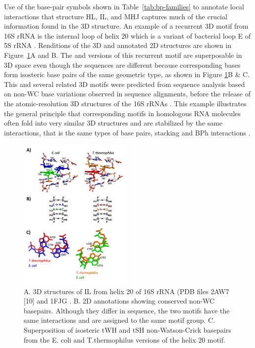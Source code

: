 Use of the base-pair symbols shown in Table~\ref{tab:bp-families} to annotate local interactions
that structure HL, IL, and MHJ captures much of the crucial information found in
the 3D structure. An example of a recurrent 3D motif from 16S rRNA is the
internal loop of helix 20 which is a variant of bacterial loop E of 5S rRNA
\cite{Leontis1998a}. Renditions of the 3D and annotated 2D structures are shown
in Figure~\ref{fig:compare-il}A and B. The \EC{} and \TT{} versions of this
recurrent motif are superposable in 3D space even though the sequences are
different because corresponding bases form isosteric base pairs of the same
geometric type, as shown in Figure \ref{fig:compare-il}B \& C. This and several
related 3D motifs were predicted from sequence analysis based on non-WC base
variations observed in sequence alignments, before the release of the
atomic-resolution 3D structures of the 16S rRNAs \cite{Leontis1998,
Leontis2002e}. This example illustrates the general principle that corresponding
motifs in homologous RNA molecules often fold into very similar 3D structures
and are stabilized by the same interactions, that is the same types of base
pairs, stacking and BPh interactions \cite{Petrov2013}.

\begin{figure}
  \includegraphics[width=0.5\textwidth]{chapter-1/figs/IL-20}
  \caption{A. 3D structures of IL from helix 20 of 16S rRNA (PDB files 2AW7 [10]
    and 1FJG \cite{Carter2000}. B. 2D annotations showing conserved non-WC basepairs.
    Although they differ in sequence, the two motifs have the same interactions
    and are assigned to the same motif group. C. Superposition of isosteric tWH
    and tSH non-Watson-Crick basepairs from the E. coli and T.thermophilus
  versions of the helix 20 motif.}
  \label{fig:compare-il}
\end{figure}

